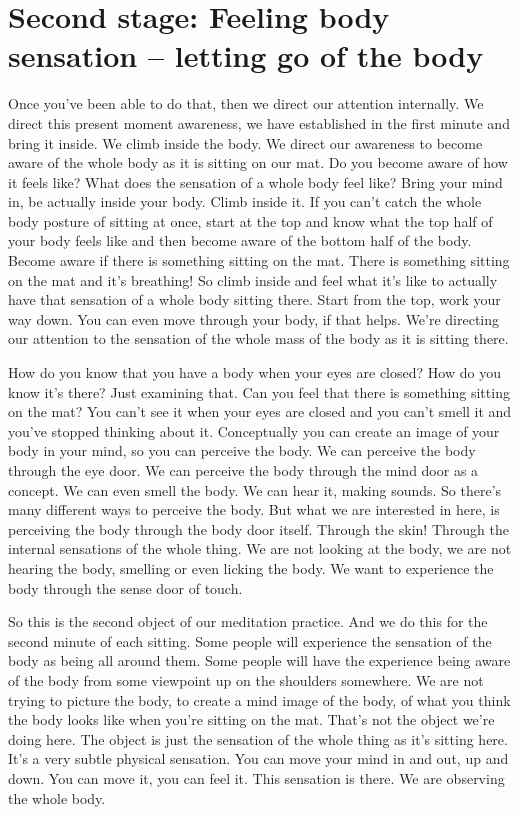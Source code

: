 \documentclass[letterpaper,10pt,english]{sphinxmanual}
\begin{document}
\section{Second  stage:  Feeling  body  sensation  –  letting  go  of  the body}
\label{\detokenize{0-b:second-stage-feeling-body-sensation-letting-go-of-the-body}}
\sphinxAtStartPar
Once  you’ve  been  able  to  do  that,  then  we  direct  our  attention  internally. We direct this present moment awareness, we have established in the
first  minute  and  bring  it  inside.  We  climb  inside  the  body.  We  direct  our
awareness to become aware of the whole body as it is sitting on our mat. Do
you become aware of how it feels like? What does the sensation of a whole
body  feel  like?  Bring  your  mind  in,  be  actually  inside  your  body.  Climb
inside it. If you can’t catch the whole body posture of sitting at once, start at
the top and know what the top half of your body feels like and then become
aware of the bottom half of the body. Become aware if there is something
sitting on the mat. There is something sitting on the mat and it’s breathing!
So climb inside and feel what it’s like to actually have that sensation of a
whole body sitting there. Start from the top, work your way down. You can
even move through your body, if that helps. We’re directing our attention to
the sensation of the whole mass of the body as it is sitting there.

\sphinxAtStartPar
{}  How do you know that you have a body when your eyes are closed?
How do you know it’s there? Just examining that. Can you feel that there is
something sitting on the mat? You can’t see it when your eyes are closed and
you can’t smell it and you’ve stopped thinking about it. Conceptually you can
create an image of your body in your mind, so you can perceive the body.
We can perceive the body through the eye door. We can perceive the body
through the mind door as a concept. We can even smell the body. We can
hear it, making sounds. So there’s many different ways to perceive the body.
But what we are interested in here, is perceiving the body through the body
door itself. Through the skin! Through the internal sensations of the whole
thing. We are not looking at the body, we are not hearing the body, smelling
or even licking the body. We want to experience the body through the sense
door of touch.

\sphinxAtStartPar
So this is the second object of our meditation practice. And we do this
for the second minute of each sitting. Some people will experience the sensation of the body as being all around them. Some people will have the experience  being  aware  of  the  body  from  some  viewpoint  up  on  the  shoulders
somewhere. We are not trying to picture the body, to create a mind image of
the body, of what you think the body looks like when you’re sitting on the
mat. That’s not the object we’re doing here. The object is just the sensation
of the whole thing as it’s sitting here. It’s a very subtle physical sensation.
You can move your mind in and out, up and down. You can move it, you can
feel it. This sensation is there. We are observing the whole body.
\end{document}
